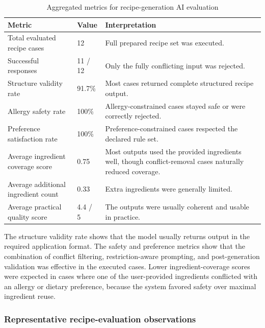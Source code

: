 \begin{table}[H]
	\centering
	\scriptsize
	\renewcommand{\arraystretch}{1.2}
	\begin{tabularx}{\textwidth}{|p{4.2cm}|p{2.6cm}|>{\raggedright\arraybackslash}X|}
		\hline
		\textbf{Metric} & \textbf{Value} & \textbf{Interpretation} \\
		\hline
		Total evaluated recipe cases & 12 & Full prepared recipe set was executed. \\
		\hline
		Successful responses & 11 / 12 & Only the fully conflicting input was rejected. \\
		\hline
		Structure validity rate & 91.7\% & Most cases returned complete structured recipe output. \\
		\hline
		Allergy safety rate & 100\% & Allergy-constrained cases stayed safe or were correctly rejected. \\
		\hline
		Preference satisfaction rate & 100\% & Preference-constrained cases respected the declared rule set. \\
		\hline
		Average ingredient coverage score & 0.75 & Most outputs used the provided ingredients well, though conflict-removal cases naturally reduced coverage. \\
		\hline
		Average additional ingredient count & 0.33 & Extra ingredients were generally limited. \\
		\hline
		Average practical quality score & 4.4 / 5 & The outputs were usually coherent and usable in practice. \\
		\hline
		\end{tabularx}
	\caption{Aggregated metrics for recipe-generation AI evaluation}
	\label{tab:recipe-ai-metrics}
\end{table}

The structure validity rate shows that the model usually returns output
in the required application format. The safety and preference metrics
show that the combination of conflict filtering, restriction-aware
prompting, and post-generation validation was effective in the executed
cases. Lower ingredient-coverage scores were expected in cases where
one of the user-provided ingredients conflicted with an allergy or
dietary preference, because the system favored safety over maximal
ingredient reuse.

\subsubsection{Representative recipe-evaluation observations}

